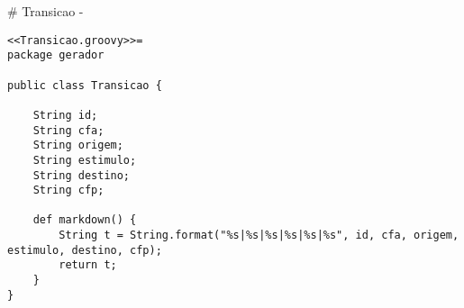# Transicao {-}

\begin{lstlisting}
<<Transicao.groovy>>=
package gerador

public class Transicao {

    String id;
    String cfa;
    String origem;
    String estimulo;
    String destino;
    String cfp;

    def markdown() {
        String t = String.format("%s|%s|%s|%s|%s|%s", id, cfa, origem, estimulo, destino, cfp);
        return t;
    }
}

\end{lstlisting}

